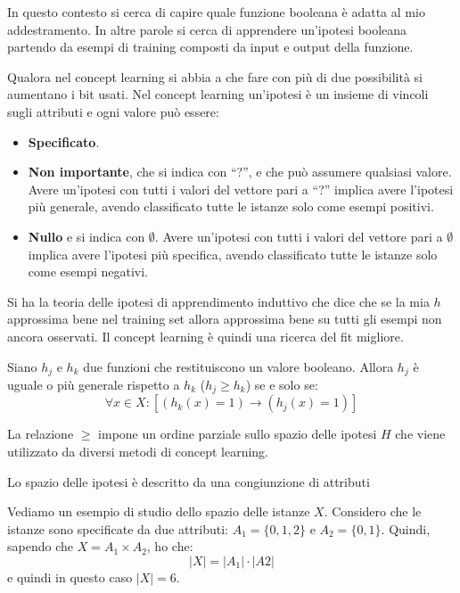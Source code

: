 In questo contesto si cerca di capire quale funzione booleana è adatta al mio addestramento. In altre parole si cerca di apprendere un'ipotesi booleana partendo da esempi di training composti da input e output della funzione. 

Qualora nel concept learning si abbia a che fare con più di due possibilità si aumentano i bit usati. Nel concept learning un'ipotesi è un insieme di vincoli sugli attributi e ogni valore può essere:
\begin{itemize}
    \item \textbf{Specificato}.
    \item \textbf{Non importante}, che si indica con “?”, e che può assumere qualsiasi valore. Avere un'ipotesi con tutti i valori del vettore pari a “?” implica avere l’ipotesi più generale, avendo classificato tutte le istanze solo come esempi positivi.
    \item \textbf{Nullo} e si indica con $\emptyset$. Avere un'ipotesi con tutti i valori del vettore pari a $\emptyset$ implica avere l'ipotesi più specifica, avendo classificato tutte le istanze solo come esempi negativi.
\end{itemize}

Si ha la teoria delle ipotesi di apprendimento induttivo che dice che se la mia $h$ approssima bene nel training set allora approssima bene su tutti gli esempi non ancora osservati. Il concept learning è quindi una ricerca del fit migliore.

\begin{definizione}
    Siano $h_j$ e $h_k$ due funzioni che restituiscono un valore booleano. Allora $h_j$ è uguale o più generale rispetto a $h_k$ ($h_j \geq h_k$) se e solo se:
    \begin{equation}
        \forall x \in X: [(h_k(x) = 1) \to (h_j(x) = 1)]
    \end{equation}

    La relazione $\geq$ impone un ordine parziale sullo spazio delle ipotesi $H$ che viene utilizzato da diversi metodi di concept learning.

    Lo spazio delle ipotesi è descritto da una congiunzione di attributi
\end{definizione}

Vediamo un esempio di studio dello spazio delle istanze $X$. Considero che le istanze sono specificate da due attributi: $A_1 = \{0, 1, 2\}$ e $A_2 = \{0, 1\}$. Quindi, sapendo che $X = A_1 \times A_2$, ho che: $$|X| = |A_1| \cdot |A2|$$ e quindi in questo caso $|X| = 6$.

